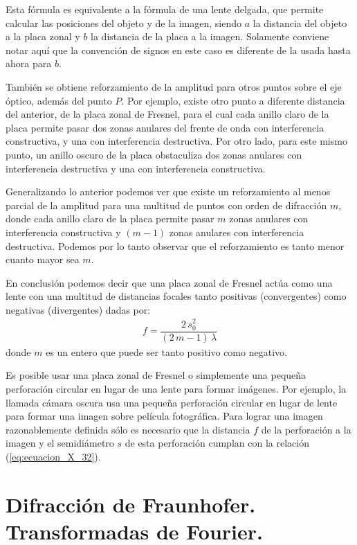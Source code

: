 \documentclass[14pt]{extarticle}
\begin{document}
Esta fórmula es equivalente a la fórmula de una lente delgada, que permite calcular las posiciones del objeto y de la imagen, siendo $a$ la distancia del objeto a la placa zonal y $b$ la distancia de la placa a la imagen. Solamente conviene notar aquí que la convención de signos en este caso es diferente de la usada hasta ahora para $b$.
\par
También se obtiene reforzamiento de la amplitud para otros puntos sobre el eje óptico, además del punto $P$. Por ejemplo, existe otro punto a diferente distancia del anterior, de la placa zonal de Fresnel, para el cual cada anillo claro de la placa permite pasar dos zonas anulares del frente de onda con interferencia constructiva, y una con interferencia destructiva. Por otro lado, para este mismo punto, un anillo oscuro de la placa obstaculiza dos zonas anulares con interferencia destructiva y una con interferencia constructiva.
\par
Generalizando lo anterior podemos ver que existe un reforzamiento al menos parcial de la amplitud para una multitud de puntos con orden de difracción $m$, donde cada anillo claro de la placa permite pasar $m$ zonas anulares con interferencia constructiva y $(m - 1)$ zonas anulares con interferencia destructiva. Podemos por lo tanto observar que el reforzamiento es tanto menor cuanto mayor sea $m$.
\par
En conclusión podemos decir que una placa zonal de Fresnel actúa como una lente con una multitud de distancias focales tanto positivas (convergentes) como negativas (divergentes) dadas por:
\begin{align}
f = \dfrac{2 \, s_{0}^{2}}{(2 \, m - 1) \, \lambda}
\label{eq:ecuacion_X_34}
\end{align}
donde $m$ es un entero que puede ser tanto positivo como negativo.
\par
Es posible usar una placa zonal de Fresnel o simplemente una pequeña perforación circular en lugar de una lente para formar imágenes. Por ejemplo, la llamada cámara oscura usa una pequeña perforación circular en lugar de lente para formar una imagen sobre película fotográfica. Para lograr una imagen razonablemente definida sólo es necesario que la distancia $f$ de la perforación a la imagen y el semidiámetro $s$ de esta perforación cumplan con la relación (\ref{eq:ecuacion_X_32}).

\section{Difracción de Fraunhofer. Transformadas de Fourier.}
 
\end{document}
